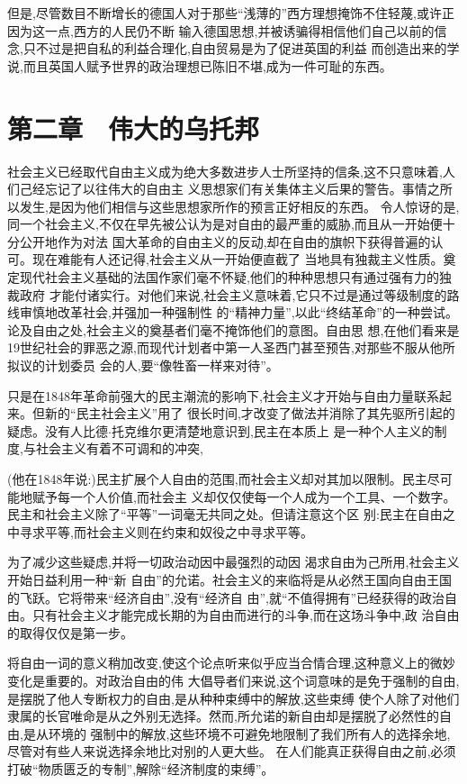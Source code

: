﻿\documentclass[12pt]{article}
\begin{document}
但是,尽管数目不断增长的德国人对于那些``浅薄的''西方理想掩饰不住轻蔑,或许正因为这一点,西方的人民仍不断
输入德国思想,并被诱骗得相信他们自己以前的信念,只不过是把自私的利益合理化,自由贸易是为了促进英国的利益
而创造出来的学说,而且英国人赋予世界的政治理想已陈旧不堪,成为一件可耻的东西。



\section{第二章　伟大的乌托邦}


社会主义已经取代自由主义成为绝大多数进步人士所坚持的信条,这不只意味着,人们己经忘记了以往伟大的自由主
义思想家们有关集体主义后果的警告。事情之所以发生,是因为他们相信与这些思想家所作的预言正好相反的东西。
令人惊讶的是,同一个社会主义,不仅在早先被公认为是对自由的最严重的威胁,而且从一开始便十分公开地作为对法
国大革命的自由主义的反动,却在自由的旗帜下获得普遍的认可。现在难能有人还记得,社会主义从一开始便直截了
当地具有独裁主义性质。奠定现代社会主义基础的法国作家们毫不怀疑,他们的种种思想只有通过强有力的独裁政府
才能付诸实行。对他们来说,社会主义意味着,它只不过是通过等级制度的路线审慎地改革社会,并强加一种强制性
的``精神力量'',以此``终结革命''的一种尝试。论及自由之处,社会主义的奠基者们毫不掩饰他们的意图。自由思
想,在他们看来是19世纪社会的罪恶之源,而现代计划者中第一人圣西门甚至预告,对那些不服从他所拟议的计划委员
会的人,要``像牲畜一样来对待''。

只是在1848年革命前强大的民主潮流的影响下,社会主义才开始与自由力量联系起来。但新的``民主社会主义''用了
很长时间,才改变了做法并消除了其先驱所引起的疑虑。没有人比德$\cdot$托克维尔更清楚地意识到,民主在本质上
是一种个人主义的制度,与社会主义有着不可调和的冲突,

(他在1848年说:)民主扩展个人自由的范围,而社会主义却对其加以限制。民主尽可能地赋予每一个人价值,而社会主
义却仅仅使每一个人成为一个工具、一个数字。民主和社会主义除了``平等''一词毫无共同之处。但请注意这个区
别:民主在自由之中寻求平等,而社会主义则在约束和奴役之中寻求平等。

为了减少这些疑虑,并将一切政治动因中最强烈的动因 \myrule 渴求自由为己所用,社会主义开始日益利用一种``新
自由''的允诺。社会主义的来临将是从必然王国向自由王国的飞跃。它将带来``经济自由'',没有``经济自
由'',就``不值得拥有''已经获得的政治自由。只有社会主义才能完成长期的为自由而进行的斗争,而在这场斗争中,政
治自由的取得仅仅是第一步。

将自由一词的意义稍加改变,使这个论点听来似乎应当合情合理,这种意义上的微妙变化是重要的。对政治自由的伟
大倡导者们来说,这个词意味的是免于强制的自由,是摆脱了他人专断权力的自由,是从种种束缚中的解放,这些束缚
使个人除了对他们隶属的长官唯命是从之外别无选择。然而,所允诺的新自由却是摆脱了必然性的自由,是从环境的
强制中的解放,这些环境不可避免地限制了我们所有人的选择余地,尽管对有些人来说选择余地比对别的人更大些。
在人们能真正获得自由之前,必须打破``物质匮乏的专制'',解除``经济制度的束缚''。
\end{document}
